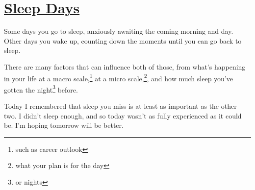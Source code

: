 \documentclass[12pt]{article}[titlepage]
\newcommand{\1}{\={a}}
\newcommand{\2}{\={e}}
\newcommand{\3}{\={\i}}
\newcommand{\4}{\=o}
\newcommand{\5}{\=u}
\newcommand{\6}{\={A}}
\renewcommand{\,}{\textsuperscript{,}}
\begin{document}
\doublespacing
\section{\href{sleepy-days.html}{Sleep Days}}
Some days you go to sleep, anxiously awaiting the coming morning and day. Other days you wake up, counting down the moments until you can go back to sleep.

There are many factors that can influence both of those, from what's happening in your life at a macro scale,\footnote{such as career outlook} at a micro scale,\footnote{what your plan is for the day}, and how much sleep you've gotten the night\footnote{or nights} before.

Today I remembered that sleep you miss is at least as important as the other two. I didn't sleep enough, and so today wasn't as fully experienced as it could be. I'm hoping tomorrow will be better.
\end{document}
